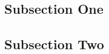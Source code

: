 \documentclass[twoside]{article}
\begin{document}
\subsection{Subsection One}

\lipsum[7] %

\subsection{Subsection Two}

\lipsum[8] %


%
% 



%





%
\end{document}
